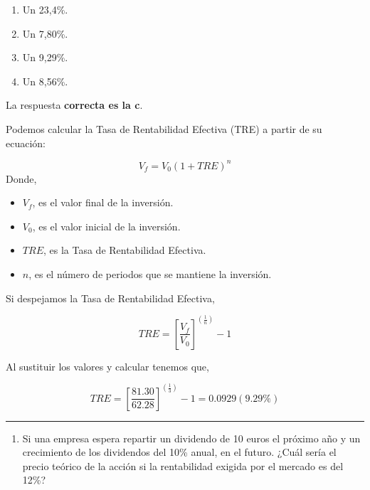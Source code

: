\documentclass[
  letterpaper,
  DIV=11,
  numbers=noendperiod]{scrreprt}
\providecommand{\tightlist}{%
  \setlength{\itemsep}{0pt}\setlength{\parskip}{0pt}}\usepackage{longtable,booktabs,array}
\begin{document}
\begin{enumerate}
\def\labelenumi{\alph{enumi})}
\item
  Un 23,4\%.
\item
  Un 7,80\%.
\item
  Un 9,29\%.
\item
  Un 8,56\%.
\end{enumerate}

\begin{tcolorbox}[enhanced jigsaw, left=2mm, opacityback=0, colback=white, breakable, arc=.35mm, bottomrule=.15mm, rightrule=.15mm, toprule=.15mm, leftrule=.75mm, colframe=quarto-callout-tip-color-frame]
\begin{minipage}[t]{5.5mm}
\textcolor{quarto-callout-tip-color}{\faLightbulb}
\end{minipage}%
\begin{minipage}[t]{\textwidth - 5.5mm}

La respuesta \textbf{correcta es la c}.

Podemos calcular la Tasa de Rentabilidad Efectiva (TRE) a partir de su
ecuación:

\[{ V }_{ f }={ V }_{ 0 }{ (1+TRE) }^{ n }\] Donde,

\begin{itemize}
\item
  \({ V }_{ f }\), es el valor final de la inversión.
\item
  \({ V }_{ 0 }\), es el valor inicial de la inversión.
\item
  \(TRE\), es la Tasa de Rentabilidad Efectiva.
\item
  \(n\), es el número de periodos que se mantiene la inversión.
\end{itemize}

Si despejamos la Tasa de Rentabilidad Efectiva,

\[TRE=\left[\frac{V_f}{V_0}\right]^{\left(\frac{1}{n}\right)}-1\]

Al sustituir los valores y calcular tenemos que,

\[TRE=\left[\frac{81.30}{62.28}\right]^{\left(\frac{1}{3}\right)}-1=0.0929(9.29\%)\]

\end{minipage}%
\end{tcolorbox}

\begin{center}\rule{0.5\linewidth}{0.5pt}\end{center}

\begin{enumerate}
\def\labelenumi{\arabic{enumi}.}
\setcounter{enumi}{50}
\tightlist
\item
  Si una empresa espera repartir un dividendo de 10 euros el próximo año
  y un crecimiento de los dividendos del 10\% anual, en el futuro. ¿Cuál
  sería el precio teórico de la acción si la rentabilidad exigida por el
  mercado es del 12\%?
\end{enumerate}
\end{document}
